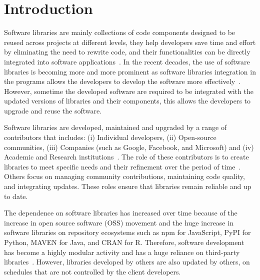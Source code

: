 \chapter{Introduction}\label{intro}
Software libraries are mainly collections of code components designed to be reused
across projects at different levels, they help developers save time and effort by
eliminating the need to rewrite code, and their functionalities can be directly integrated
into software applications~\cite{Sawant2015APIUsage}. In the recent decades, the use of software libraries is
becoming more and more prominent as software libraries integration in the programs
allows the developers to develop the software more effectively~\cite{Cybulski2007requirements}. However, sometime
the developed software are required to be integrated with the updated versions of
libraries and their components, this allows the developers to upgrade and reuse the
software.

Software libraries are developed, maintained and upgraded by a range of contributors
that includes: (i) Individual developers, (ii) Open-source communities, (iii) Companies
(such as Google, Facebook, and Microsoft) and (iv) Academic and Research
institutions~\cite{Lakhani2000OSS}. The role of these contributors is to create libraries to meet specific needs
and their refinement over the period of time~\cite{Decan2018npm}. Others focus on managing community
contributions, maintaining code quality, and integrating updates. These roles ensure that
libraries remain reliable and up to date.

The dependence on software libraries has increased over time because of the increase in open source software (OSS) movement and the huge increase in software libraries on repository ecosystems such as npm for JavaScript, PyPI for Python, MAVEN for Java, and CRAN for R. Therefore, software development has become a highly modular activity and has a huge reliance on third-party libraries~\cite{decan2019empirical, kalliamvakou2014promises, zerouali2019formal, cox2019surviving}. However, libraries developed by others are also updated by others, on schedules that are not controlled by the client developers.


